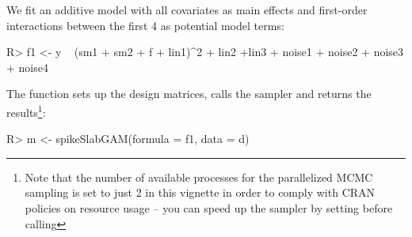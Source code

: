 \documentclass[article, shortnames, nojss, noheadings, notitle]{jss}
\begin{document}
We fit an additive model with all covariates as main effects and first-order interactions between the first 4 as potential model terms:
\begin{Schunk}
\begin{Sinput}
R> f1 <- y ~ (sm1 + sm2 + f + lin1)^2 + lin2 +lin3 + noise1 + noise2 + noise3 + noise4
\end{Sinput}
\end{Schunk}
The function  sets up the design matrices, calls the sampler and returns the results\footnote{Note that the number of available processes for
the parallelized MCMC sampling is set to just 2 in this vignette in order to comply with CRAN policies on resource usage -- you can speed up the sampler by setting  before calling }:
\begin{Schunk}
\begin{Sinput}
R> m <- spikeSlabGAM(formula = f1, data = d)
\end{Sinput}
\end{Schunk}
\end{document}
